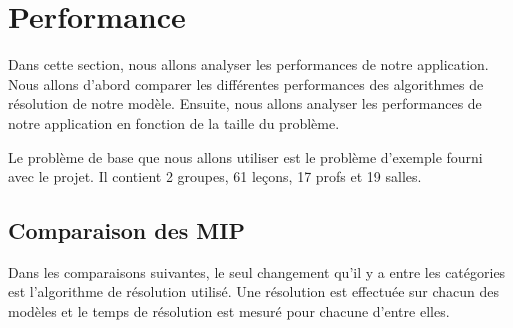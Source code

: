 \section{Performance}
Dans cette section, nous allons analyser les performances de notre application. Nous allons d'abord comparer les différentes performances des algorithmes de résolution de notre modèle. Ensuite, nous allons analyser les performances de notre application en fonction de la taille du problème.

Le problème de base que nous allons utiliser est le problème d'exemple fourni avec le projet. Il contient 2 groupes, 61 leçons, 17 profs et 19 salles.

\subsection{Comparaison des MIP}
Dans les comparaisons suivantes, le seul changement qu'il y a entre les catégories est l'algorithme de résolution utilisé. Une résolution est effectuée sur chacun des modèles et le temps de résolution est mesuré pour chacune d'entre elles.
